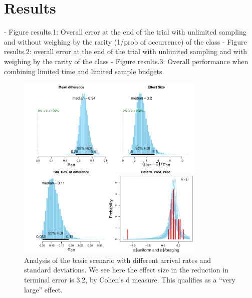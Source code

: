 \section{Results}
\label{sec:results}


- Figure results.1: Overall error at the end of the trial with unlimited sampling and without weighing by the rarity (1/prob of occurrence) of the class
- Figure results.2: overall error at the end of the trial with unlimited sampling and with weighing by the rarity of the class
- Figure results.3: Overall performance when combining limited time and limited sample budgets.


\begin{figure}[htpd]
	\centering
	\includegraphics[width=0.8\textwidth]{images/diff-diff.pdf}
	\caption{Analysis of the basic scenario with different arrival rates and standard deviations.  We see here the effect size in the reduction in terminal error is 3.2, by Cohen's d measure.  This qualifies as a ``very large'' effect.}
	\label{fig:diff-diff}
\end{figure}
